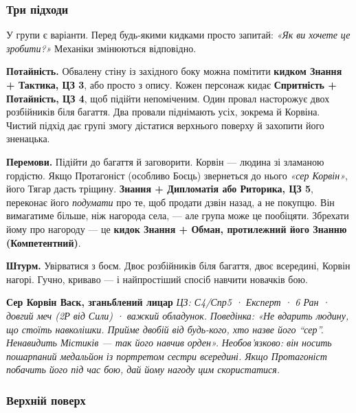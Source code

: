 \documentclass[10pt,a4paper]{article}
\begin{document}
\subsubsection{Три підходи}\label{ux442ux440ux438-ux43fux456ux434ux445ux43eux434ux438}

У групи є варіанти. Перед будь-якими кидками просто запитай: \emph{«Як ви хочете це зробити?»} Механіки змінюються відповідно.

\textbf{Потайність.} Обвалену стіну із західного боку можна помітити \textbf{кидком Знання + Тактика, ЦЗ 3}, або просто з опису. Кожен персонаж кидає \textbf{Спритність + Потайність, ЦЗ 4}, щоб підійти непоміченим. Один провал насторожує двох розбійників біля багаття. Два провали піднімають усіх, зокрема й Корвіна. Чистий підхід дає групі змогу дістатися верхнього поверху й захопити його зненацька.

\par{}\noindent\textbf{Перемови.} Підійти до багаття й заговорити. Корвін --- людина зі зламаною гордістю. Якщо Протагоніст (особливо Боєць) звернеться до нього \emph{«сер Корвін»}, його Тягар дасть тріщину. \textbf{Знання + Дипломатія або Риторика, ЦЗ 5}, переконає його \emph{подумати} про те, щоб продати дзвін назад, а не покупцю. Він вимагатиме більше, ніж нагорода села, --- але група може це пообіцяти. Збрехати йому про нагороду --- це \textbf{кидок Знання + Обман, протилежний його Знанню (Компетентний)}.

\textbf{Штурм.} Увірватися з боєм. Двоє розбійників біля багаття, двоє всередині, Корвін нагорі. Гучно, криваво --- і найпростіший спосіб навчити новачків бою.

\par\smallskip\begin{rpgnote}[fontupper=\normalfont]\textbf{Сер Корвін Васк, зганьблений лицар} \emph{ЦЗ: С4/Спр5 · Експерт · 6 Ран · довгий меч (2Р від Сили) · важкий обладунок.} \emph{Поведінка: «Не вдарить людину, що стоїть навколішки. Прийме двобій від будь-кого, хто назве його “сер”. Ненавидить Містиків --- так його навчив орден».} \emph{Необов’язково: він носить пошарпаний медальйон із портретом сестри всередині. Якщо Протагоніст побачить його під час бою, дай йому нагоду цим скористатися.}\end{rpgnote}\par\smallskip
\subsubsection{Верхній поверх}\label{ux432ux435ux440ux445ux43dux456ux439-ux43fux43eux432ux435ux440ux445}
\end{document}
